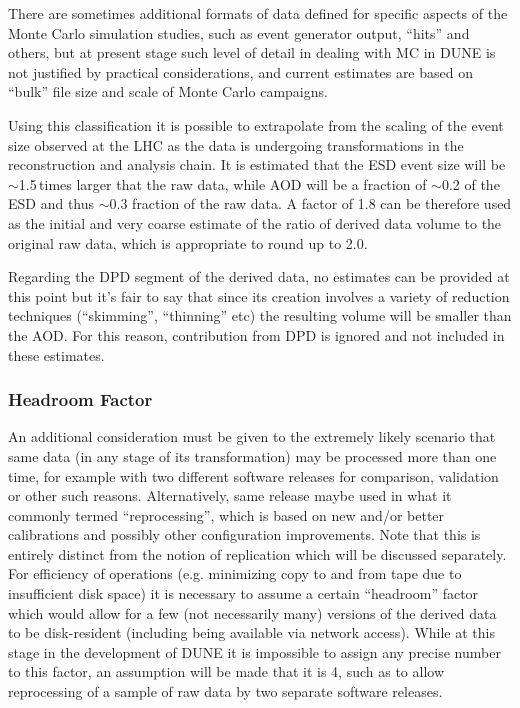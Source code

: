 \noindent
There are sometimes additional formats of data defined for specific aspects of the Monte Carlo simulation studies, such as
event generator output, ``hits'' and others, but at present stage such level of detail in dealing with MC in DUNE is not
justified by practical considerations, and current estimates are based on ``bulk'' file size and scale of Monte Carlo campaigns.

Using this classification it is possible to extrapolate from the scaling of the event size observed at the LHC as the data
is undergoing transformations in the reconstruction and analysis chain. It is estimated that the ESD event size will be
$\sim$1.5\,times larger that the raw data, while AOD will be a fraction of $\sim$0.2 of the ESD and thus $\sim$0.3 fraction
of the raw data.
A factor of 1.8 can be therefore used as the initial and very coarse estimate of the ratio of derived data volume to
the original raw data, which is appropriate to round up to 2.0.

Regarding the DPD segment of the derived data, no estimates can be provided at this point but it's fair to say that since
its creation involves a variety of reduction techniques (``skimming'', ``thinning'' etc) the resulting volume will be smaller than
the AOD. For this reason, contribution from DPD is ignored and not included in these estimates.

\subsubsection{Headroom Factor}
An additional consideration must be given to the extremely likely scenario that same data (in any stage of
its transformation) may be processed more than one time, for example with two different software releases for comparison,
validation or other such reasons. Alternatively, same release maybe used in what it commonly termed ``reprocessing'',
which is based on new and/or better calibrations and possibly other configuration improvements. Note that this is entirely
distinct from the notion of replication which will be discussed separately. For efficiency of operations (e.g. minimizing copy
to and from tape due to insufficient disk space) it is necessary to assume a certain ``headroom'' factor which would allow
for a few (not necessarily many) versions of the derived data to be disk-resident (including being available via
network access). While at this stage in the development of DUNE it is impossible to assign any precise number to this
factor, an assumption will be made that it is 4, such as to allow reprocessing of a sample of raw data by two separate
software releases.

